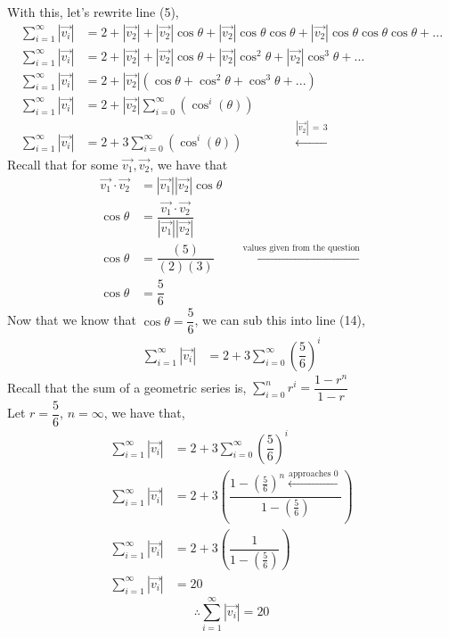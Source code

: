 \documentclass[12pt]{book}
\begin{document}
\begin{enumerate}
With this, let's rewrite line (5),
\begin{align}
    \sum\limits_{i=1}^{\infty} |\vec{v_i}| &= 2 + |\vec{v_2}| + |\vec{v_2}|\cos\theta + |\vec{v_2}|\cos\theta\cos\theta + |\vec{v_2}|\cos\theta\cos\theta\cos\theta + ... \\
    \sum\limits_{i=1}^{\infty} |\vec{v_i}| &= 2 + |\vec{v_2}| + |\vec{v_2}|\cos\theta + |\vec{v_2}|\cos^2\theta + |\vec{v_2}|\cos^3\theta + ... \\
    \sum\limits_{i=1}^{\infty} |\vec{v_i}| &= 2 + |\vec{v_2}| \left(\cos\theta + \cos^2\theta + \cos^3\theta + ... \right) \\
    \sum\limits_{i=1}^{\infty} |\vec{v_i}| &= 2 + |\vec{v_2}| \sum\limits_{i=0}^{\infty}\left(\cos^i(\theta)\right) \\
    \sum\limits_{i=1}^{\infty} |\vec{v_i}| &= 2 + 3 \sum\limits_{i=0}^{\infty}\left(\cos^i(\theta)\right) \qquad \qquad \xleftarrow[]{|\vec{v_2}| \,=\, 3}
\end{align}
Recall that for some $\vec{v_1}, \vec{v_2}$, we have that
\begingroup
\addtolength{\jot}{0.5em}
\begin{align}
    \vec{v_1}\cdot\vec{v_2} &= |\vec{v_1}||\vec{v_2}|\cos\theta \\
    \cos\theta &= \dfrac{\vec{v_1} \cdot \vec{v_2}}{|\vec{v_1}||\vec{v_2}|} \\
    \cos\theta &= \dfrac{(5)}{(2)(3)} \qquad \xleftarrow[]{\text{values given from the question}} \\
    \cos\theta &= \dfrac{5}{6}
\end{align}
\endgroup
Now that we know that $\cos\theta = \dfrac{5}{6}$, we can sub this into line (14),
\begin{align}
    \sum\limits_{i=1}^{\infty} |\vec{v_i}| &= 2 + 3 \sum\limits_{i=0}^{\infty}\left(\dfrac{5}{6}\right)^i
\end{align}
Recall that the sum of a geometric series is,
$\sum\limits_{i=0}^{n}r^i = \dfrac{1-r^n}{1-r}$\\
Let $r=\dfrac{5}{6}$, $n=\infty$, we have that,
\begin{align}
    \sum\limits_{i=1}^{\infty} |\vec{v_i}| &= 2 + 3 \sum\limits_{i=0}^{\infty}\left(\dfrac{5}{6}\right)^i \\
    \sum\limits_{i=1}^{\infty} |\vec{v_i}| &= 2 + 3 \left(\dfrac{1-\left(\frac{5}{6}\right)^n \xleftarrow[]{\text{approaches 0}}}{1-\left(\frac{5}{6}\right)}\right)\\
    \sum\limits_{i=1}^{\infty} |\vec{v_i}| &= 2 + 3 \left(\dfrac{1}{1-\left(\frac{5}{6}\right)}\right)\\
    \sum\limits_{i=1}^{\infty} |\vec{v_i}| &= 20
\end{align}
$$\therefore \sum\limits_{i=1}^{\infty} |\vec{v_i}| = 20$$




\end{enumerate}
\end{document}
